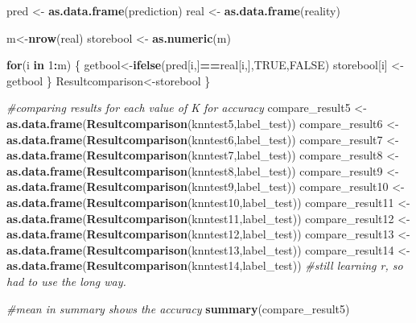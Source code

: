 \documentclass[]{article}
\newenvironment{Shaded}{\begin{snugshade}}{\end{snugshade}}
\newcommand{\KeywordTok}[1]{\textcolor[rgb]{0.13,0.29,0.53}{\textbf{#1}}}
\newcommand{\DecValTok}[1]{\textcolor[rgb]{0.00,0.00,0.81}{#1}}
\newcommand{\StringTok}[1]{\textcolor[rgb]{0.31,0.60,0.02}{#1}}
\newcommand{\CommentTok}[1]{\textcolor[rgb]{0.56,0.35,0.01}{\textit{#1}}}
\newcommand{\OtherTok}[1]{\textcolor[rgb]{0.56,0.35,0.01}{#1}}
\newcommand{\ControlFlowTok}[1]{\textcolor[rgb]{0.13,0.29,0.53}{\textbf{#1}}}
\newcommand{\OperatorTok}[1]{\textcolor[rgb]{0.81,0.36,0.00}{\textbf{#1}}}
\newcommand{\NormalTok}[1]{#1}
\begin{document}
\begin{Shaded}
\begin{Highlighting}[]
\NormalTok{  pred <-}\StringTok{ }\KeywordTok{as.data.frame}\NormalTok{(prediction)}
\NormalTok{  real <-}\StringTok{ }\KeywordTok{as.data.frame}\NormalTok{(reality)}
  
\NormalTok{  m<-}\KeywordTok{nrow}\NormalTok{(real)}
\NormalTok{  storebool <-}\StringTok{ }\KeywordTok{as.numeric}\NormalTok{(m)}
  
  \ControlFlowTok{for}\NormalTok{(i }\ControlFlowTok{in} \DecValTok{1}\OperatorTok{:}\NormalTok{m)}
\NormalTok{  \{}
\NormalTok{    getbool<-}\KeywordTok{ifelse}\NormalTok{(pred[i,]}\OperatorTok{==}\NormalTok{real[i,],}\OtherTok{TRUE}\NormalTok{,}\OtherTok{FALSE}\NormalTok{)}
\NormalTok{    storebool[i] <-}\StringTok{ }\NormalTok{getbool}
\NormalTok{  \}}
\NormalTok{  Resultcomparison<-storebool}
\NormalTok{\}}


\CommentTok{#comparing results for each value of K for accuracy}
\NormalTok{compare_result5 <-}\StringTok{ }\KeywordTok{as.data.frame}\NormalTok{(}\KeywordTok{Resultcomparison}\NormalTok{(knntest5,label_test))}
\NormalTok{compare_result6 <-}\StringTok{ }\KeywordTok{as.data.frame}\NormalTok{(}\KeywordTok{Resultcomparison}\NormalTok{(knntest6,label_test))}
\NormalTok{compare_result7 <-}\StringTok{ }\KeywordTok{as.data.frame}\NormalTok{(}\KeywordTok{Resultcomparison}\NormalTok{(knntest7,label_test))}
\NormalTok{compare_result8 <-}\StringTok{ }\KeywordTok{as.data.frame}\NormalTok{(}\KeywordTok{Resultcomparison}\NormalTok{(knntest8,label_test))}
\NormalTok{compare_result9 <-}\StringTok{ }\KeywordTok{as.data.frame}\NormalTok{(}\KeywordTok{Resultcomparison}\NormalTok{(knntest9,label_test))}
\NormalTok{compare_result10 <-}\StringTok{ }\KeywordTok{as.data.frame}\NormalTok{(}\KeywordTok{Resultcomparison}\NormalTok{(knntest10,label_test))}
\NormalTok{compare_result11 <-}\StringTok{ }\KeywordTok{as.data.frame}\NormalTok{(}\KeywordTok{Resultcomparison}\NormalTok{(knntest11,label_test))}
\NormalTok{compare_result12 <-}\StringTok{ }\KeywordTok{as.data.frame}\NormalTok{(}\KeywordTok{Resultcomparison}\NormalTok{(knntest12,label_test))}
\NormalTok{compare_result13 <-}\StringTok{ }\KeywordTok{as.data.frame}\NormalTok{(}\KeywordTok{Resultcomparison}\NormalTok{(knntest13,label_test))}
\NormalTok{compare_result14 <-}\StringTok{ }\KeywordTok{as.data.frame}\NormalTok{(}\KeywordTok{Resultcomparison}\NormalTok{(knntest14,label_test))}
\CommentTok{#still learning r, so had to use the long way.}

\CommentTok{#mean in summary shows the accuracy}
\KeywordTok{summary}\NormalTok{(compare_result5)}
\end{Highlighting}
\end{Shaded}
\end{document}
